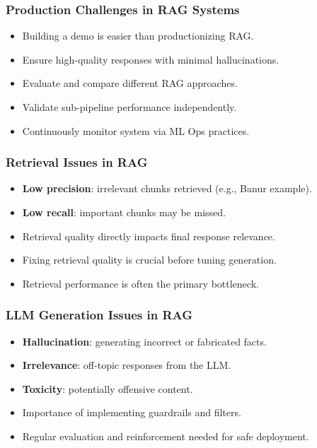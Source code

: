 \begin{frame}[fragile]\frametitle{Production Challenges in RAG Systems}
  \begin{itemize}
    \item Building a demo is easier than productionizing RAG.
    \item Ensure high-quality responses with minimal hallucinations.
    \item Evaluate and compare different RAG approaches.
    \item Validate sub-pipeline performance independently.
    \item Continuously monitor system via ML Ops practices.
  \end{itemize}
\end{frame}

\begin{frame}[fragile]\frametitle{Retrieval Issues in RAG}
  \begin{itemize}
    \item \textbf{Low precision}: irrelevant chunks retrieved (e.g., Banur example).
    \item \textbf{Low recall}: important chunks may be missed.
    \item Retrieval quality directly impacts final response relevance.
    \item Fixing retrieval quality is crucial before tuning generation.
    \item Retrieval performance is often the primary bottleneck.
  \end{itemize}
\end{frame}

\begin{frame}[fragile]\frametitle{LLM Generation Issues in RAG}
  \begin{itemize}
    \item \textbf{Hallucination}: generating incorrect or fabricated facts.
    \item \textbf{Irrelevance}: off-topic responses from the LLM.
    \item \textbf{Toxicity}: potentially offensive content.
    \item Importance of implementing guardrails and filters.
    \item Regular evaluation and reinforcement needed for safe deployment.
  \end{itemize}
\end{frame}

